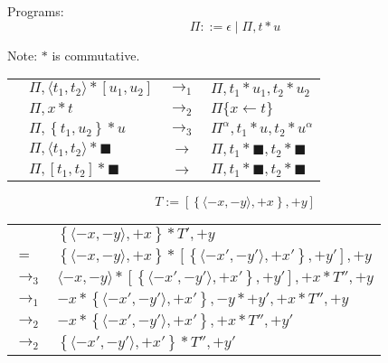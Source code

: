\documentclass{article}
\newcommand{\ca}[2]{\langle #1, #2\rangle}
\newcommand{\cs}[2]{\left[#1, #2\right]}
\newcommand{\ee}[0]{\blacksquare}
\newcommand{\contr}[1]{\left\{#1\right\}}
\begin{document}
\newpage

Programs:
\[ \Pi ::= \epsilon \mid \Pi, t * u \]

Note: $*$ is commutative.

\vspace{1em}

\begin{tabular}{l l c l}
   & $\Pi,\ca {t_1} {t_2} * \cs {u_1} {u_2}$ & $\to_1$ & $\Pi, t_1*u_1, t_2*u_2$ \\
   & $\Pi, x * t$ & $\to_2$ & $\Pi\{x \leftarrow t\}$ \\
   & $\Pi,\contr{t_1, u_2} * u$ & $\to_3$ & $\Pi^\alpha, t_1*u, t_2*u^\alpha$ \\
   & $\Pi,\ca {t_1} {t_2} * \ee$ & $\to$ & $\Pi, t_1*\ee, t_2*\ee$ \\
   & $\Pi,\cs {t_1} {t_2} * \ee$ & $\to$ & $\Pi, t_1*\ee, t_2*\ee$ \\
\end{tabular}

\vspace{2em}

\[T := \cs{\contr{\ca{-x}{-y}, +x}}{+y}\]

\begin{tabular}{ll}
    & $\contr{\ca{-x}{-y}, +x} * T', +y$ \\
    $=$ & $\contr{\ca{-x}{-y}, +x} * \cs{\contr{\ca{-x'}{-y'}, +x'}}{+y'}, +y$ \\
    $\to_3$ & $\ca{-x}{-y} * \cs{\contr{\ca{-x'}{-y'}, +x'}}{+y'}, +x * T'', +y$ \\
    $\to_1$ & $-x * \contr{\ca{-x'}{-y'}, +x'}, {-y}*{+y'}, +x * T'', +y$ \\
    $\to_2$ & $-x * \contr{\ca{-x'}{-y'}, +x'}, +x * T'', +y'$ \\
    $\to_2$ & $\contr{\ca{-x'}{-y'}, +x'} * T'', +y'$ \\
\end{tabular}

\vspace{2em}

\end{document}
